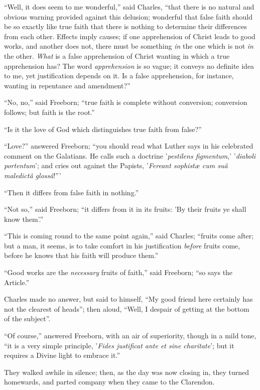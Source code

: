 ``Well, it does seem to me wonderful,'' said Charles,
``that there is no natural and obvious warning provided against
this delusion; wonderful that false faith should be so exactly like
true faith that there is nothing to determine their differences from
each other. Effects imply causes; if one apprehension of Christ leads
to good works, and another does not, there must be something \emph{in}
the one which is not \emph{in} the other. \emph{What} is a false apprehension
of Christ wanting in which a true apprehension has? The word \emph{apprehension}
is so vague; it conveys no definite idea to me, yet justification
depends on it. Is a false apprehension, for instance, wanting in
repentance and amendment?''

``No, no,'' said Freeborn; ``true faith is complete
without conversion; conversion follows; but faith is the root.''

``Is it the love of God which distinguishes true faith from
false?''

``Love?'' answered Freeborn; ``you should read what
Luther says in his celebrated comment on the Galatians. He calls such
a doctrine '\emph{pestilens figmentum},' '\emph{diaboli portentum}';
and cries out against the Papists, '\emph{Fereant sophistæ cum suâ
maledictâ glossâ}!'''

``Then it differs from false faith in nothing.''

``Not so,'' said Freeborn; ``it differs from it in its
fruits: 'By their fruits ye shall know them'.''

``This is coming round to the same point again,'' said
Charles; ``fruits come after; but a man, it seems, is to take
comfort in his justification \emph{before} fruits come, before he
knows that his faith will produce them.''

``Good works are the \emph{necessary} fruits of faith,''
said Freeborn; ``so says the Article.''

Charles made no answer, but said to himself, ``My good friend
here certainly has not the clearest of heads''; then aloud,
``Well, I despair of getting at the bottom of the subject''.

``Of course,'' answered Freeborn, with an air of
superiority, though in a mild tone, ``it is a very simple
principle, '\emph{Fides justificat ante et sine charitate}'; but it
requires a Divine light to embrace it.''

They walked awhile in silence; then, as the day was now closing in,
they turned homewards, and parted company when they came to the
Clarendon.

